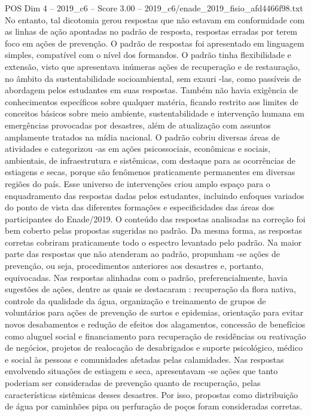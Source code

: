 \begin{textsample}{POS Dim 4 – 2019\_c6 – Score 3.00 – 2019\_c6/enade\_2019\_fisio\_afd4466f98.txt}
No entanto, tal dicotomia gerou respostas que não estavam em conformidade com as linhas de ação apontadas no padrão de resposta, respostas erradas por terem foco em ações de prevenção.
O padrão de respostas foi apresentado em linguagem simples, compatível com o nível dos formandos.
O padrão tinha flexibilidade e extensão, visto que apresentava inúmeras ações de recuperação e de restauração, no âmbito da sustentabilidade socioambiental, sem exauri -las, como passíveis de abordagem pelos estudantes em suas respostas.
Também não havia exigência de conhecimentos específicos sobre qualquer matéria, ficando restrito aos limites de conceitos básicos sobre meio ambiente, sustentabilidade e intervenção humana em emergências provocadas por desastres, além de atualização com assuntos amplamente tratados na mídia nacional.
O padrão cobriu diversas áreas de atividades e categorizou -as em ações psicossociais, econômicas e sociais, ambientais, de infraestrutura e sistêmicas, com destaque para as ocorrências de estiagens e secas, porque são fenômenos praticamente permanentes em diversas regiões do país.
Esse universo de intervenções criou amplo espaço para o enquadramento das respostas dadas pelos estudantes, incluindo enfoques variados do ponto de vista das diferentes formações e especificidades das áreas dos participantes do Enade/2019.
O conteúdo das respostas analisadas na correção foi bem coberto pelas propostas sugeridas no padrão.
Da mesma forma, as respostas corretas cobriram praticamente todo o espectro levantado pelo padrão.
Na maior parte das respostas que não atenderam ao padrão, propunham -se ações de prevenção, ou seja, procedimentos anteriores aos desastres e, portanto, equivocadas.
Nas respostas alinhadas com o padrão, preferencialmente, havia sugestões de ações, dentre as quais se destacaram : recuperação da flora nativa, controle da qualidade da água, organização e treinamento de grupos de voluntários para ações de prevenção de surtos e epidemias, orientação para evitar novos desabamentos e redução de efeitos dos alagamentos, concessão de benefícios como aluguel social e financiamento para recuperação de residências ou reativação de negócios, projetos de realocação de desabrigados e suporte psicológico, médico e social às pessoas e comunidades afetadas pelas calamidades.
Nas respostas envolvendo situações de estiagem e seca, apresentavam -se ações que tanto poderiam ser consideradas de prevenção quanto de recuperação, pelas características sistêmicas desses desastres.
Por isso, propostas como distribuição de água por caminhões pipa ou perfuração de poços foram consideradas corretas.

\end{textsample}
